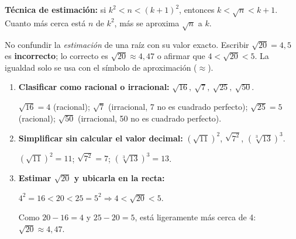 \documentclass[11pt, letterpaper]{article}
\begin{document}
\medskip
\textbf{Técnica de estimación:} si $k^2 < n < (k+1)^2$, entonces $k < \sqrt{n} < k+1$. Cuanto más cerca está $n$ de $k^2$, más se aproxima $\sqrt{n}$ a $k$.

\begin{tcolorbox}[warningbox, title={Error frecuente}]
No confundir la \emph{estimación} de una raíz con su valor exacto. Escribir $\sqrt{20} = 4{,}5$ es \textbf{incorrecto}; lo correcto es $\sqrt{20} \approx 4{,}47$ o afirmar que $4 < \sqrt{20} < 5$. La igualdad solo se usa con el símbolo de aproximación ($\approx$).
\end{tcolorbox}

\begin{tcolorbox}[examplebox, title={Ejemplos}]
\begin{enumerate}[label=\textbf{Ej. \arabic*.}, leftmargin=*]

\item \textbf{Clasificar como racional o irracional:} $\sqrt{16},\ \sqrt{7},\ \sqrt{25},\ \sqrt{50}$.

$\sqrt{16}=4$ (racional); $\sqrt{7}$ (irracional, 7 no es cuadrado perfecto); $\sqrt{25}=5$ (racional); $\sqrt{50}$ (irracional, 50 no es cuadrado perfecto).

\item \textbf{Simplificar sin calcular el valor decimal:} $(\sqrt{11})^2$, $\sqrt{7^2}$, $(\sqrt[3]{13})^3$.

$(\sqrt{11})^2 = 11$; \quad $\sqrt{7^2} = 7$; \quad $(\sqrt[3]{13})^3 = 13$.

\item \textbf{Estimar $\sqrt{20}$ y ubicarla en la recta:}

$4^2=16 < 20 < 25=5^2 \Rightarrow 4 < \sqrt{20} < 5$.

Como $20-16=4$ y $25-20=5$, está ligeramente más cerca de 4: $\sqrt{20} \approx 4{,}47$.

\begin{center}
\end{center}


\end{enumerate}
\end{tcolorbox}
\end{document}

